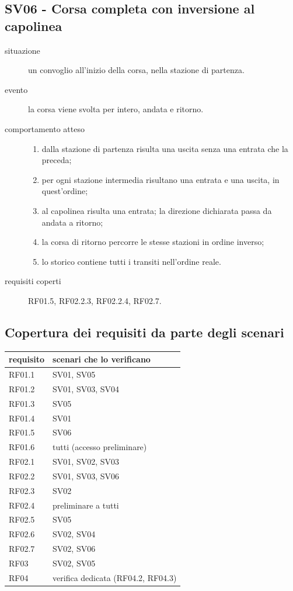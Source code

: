 \documentclass[11pt]{article}
\begin{document}
\subsection{SV06 - Corsa completa con inversione al capolinea}
\label{sec:org8a91a07}

\begin{description}
\item[{situazione}] un convoglio all'inizio della corsa, nella stazione di partenza.
\item[{evento}] la corsa viene svolta per intero, andata e ritorno.
\item[{comportamento atteso}] \begin{enumerate}
\item dalla stazione di partenza risulta una uscita senza una entrata che la preceda;
\item per ogni stazione intermedia risultano una entrata e una uscita, in quest'ordine;
\item al capolinea risulta una entrata; la direzione dichiarata passa da andata a ritorno;
\item la corsa di ritorno percorre le stesse stazioni in ordine inverso;
\item lo storico contiene tutti i transiti nell'ordine reale.
\end{enumerate}
\item[{requisiti coperti}] RF01.5, RF02.2.3, RF02.2.4, RF02.7.
\end{description}
\subsection{Copertura dei requisiti da parte degli scenari}
\label{sec:org64eb801}

\begin{center}
\begin{tabular}{ll}
requisito & scenari che lo verificano\\
\hline
RF01.1 & SV01, SV05\\
RF01.2 & SV01, SV03, SV04\\
RF01.3 & SV05\\
RF01.4 & SV01\\
RF01.5 & SV06\\
RF01.6 & tutti (accesso preliminare)\\
RF02.1 & SV01, SV02, SV03\\
RF02.2 & SV01, SV03, SV06\\
RF02.3 & SV02\\
RF02.4 & preliminare a tutti\\
RF02.5 & SV05\\
RF02.6 & SV02, SV04\\
RF02.7 & SV02, SV06\\
RF03 & SV02, SV05\\
RF04 & verifica dedicata (RF04.2, RF04.3)\\
\end{tabular}
\end{center}
\end{document}
